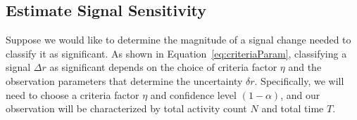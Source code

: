 \documentclass{article}
\begin{document}
%
%
%



\subsection{Estimate Signal Sensitivity}
\label{ex:3}

Suppose we would like to determine the magnitude of a signal change needed to 
classify it as significant. As shown in Equation~\ref{eq:criteriaParam}, 
classifying a signal $\Delta r$ as significant depends on the choice of criteria factor 
$\eta$ and the observation parameters that determine the uncertainty $\delta r$. 
Specifically, we will need to choose a criteria factor $\eta$ and confidence level 
$(1-\alpha)$, and our observation will be characterized by total activity count $N$ 
and total time $T$.
\end{document}
